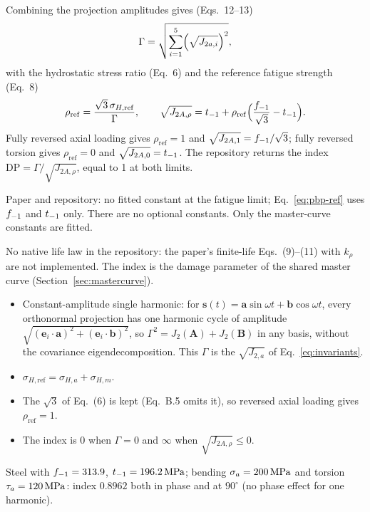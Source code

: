  Combining the projection amplitudes gives (Eqs.~12--13)
\begin{equation}
\Gamma = \sqrt{\sum_{i=1}^{5}\Bigl(\sqrt{J_{2a,i}}\Bigr)^2} ,
\label{eq:pbp-gamma}
\end{equation}
with the hydrostatic stress ratio (Eq.~6) and the reference fatigue strength (Eq.~8)
\begin{equation}
\rho_{\mathrm{ref}} = \frac{\sqrt3\,\sigma_{H,\mathrm{ref}}}{\Gamma} , \qquad
\sqrt{J_{2A,\rho}} = t_{-1} + \rho_{\mathrm{ref}}\Bigl(\frac{f_{-1}}{\sqrt3} - t_{-1}\Bigr) .
\label{eq:pbp-ref}
\end{equation}
Fully reversed axial loading gives $\rho_{\mathrm{ref}}=1$ and $\sqrt{J_{2A,1}}=f_{-1}/\sqrt3$; fully
reversed torsion gives $\rho_{\mathrm{ref}}=0$ and $\sqrt{J_{2A,0}}=t_{-1}$. The repository returns the
index $\mathrm{DP}=\Gamma/\sqrt{J_{2A,\rho}}$, equal to 1 at both limits.

 Paper and repository: no fitted constant at the fatigue limit;
Eq.~\eqref{eq:pbp-ref} uses $f_{-1}$ and $t_{-1}$ only. There are no optional constants. Only the
master-curve constants are fitted.

 No native life law in the repository: the paper's finite-life Eqs.~(9)--(11) with $k_\rho$
are not implemented. The index is the damage parameter of the shared master curve
(Section~\ref{sec:mastercurve}).

\begin{itemize}
\item Constant-amplitude single harmonic: for $\mathbf s(t)=\mathbf a\sin\omega t+\mathbf b\cos\omega t$,
  every orthonormal projection has one harmonic cycle of amplitude
  $\sqrt{(\mathbf e_i\cdot\mathbf a)^2+(\mathbf e_i\cdot\mathbf b)^2}$, so
  $\Gamma^2=J_2(\mathbf A)+J_2(\mathbf B)$ in any basis, without the covariance eigendecomposition. This
  $\Gamma$ is the $\sqrt{J_{2,a}}$ of Eq.~\eqref{eq:invariants}.
\item $\sigma_{H,\mathrm{ref}}=\sigma_{H,a}+\sigma_{H,m}$.
\item The $\sqrt3$ of Eq.~(6) is kept (Eq.~B.5 omits it), so reversed axial loading gives
  $\rho_{\mathrm{ref}}=1$.
\item The index is 0 when $\Gamma=0$ and $\infty$ when $\sqrt{J_{2A,\rho}}\le0$.
\end{itemize}

 Steel with $f_{-1}=313.9$, $t_{-1}=196.2\,\mathrm{MPa}$; bending $\sigma_a=200\,\mathrm{MPa}$ and torsion
$\tau_a=120\,\mathrm{MPa}$: index $0.8962$ both in phase and at $90^\circ$ (no phase effect for one harmonic).

